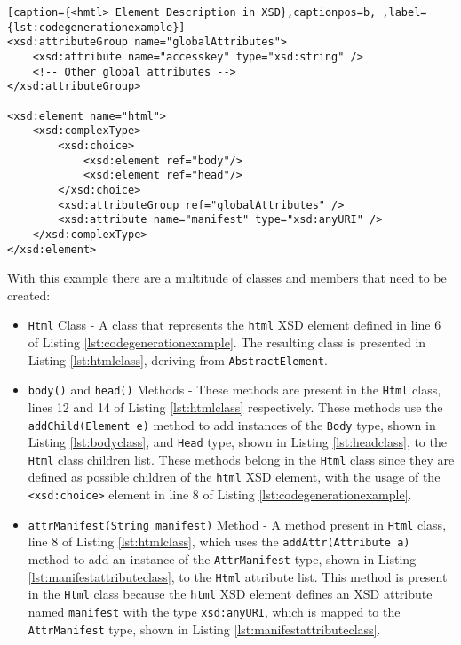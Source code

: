 \bigskip


\begin{minipage}{\linewidth}
\begin{lstlisting}[caption={<hmtl> Element Description in XSD},captionpos=b, ,label={lst:codegenerationexample}]
<xsd:attributeGroup name="globalAttributes">
    <xsd:attribute name="accesskey" type="xsd:string" />
    <!-- Other global attributes -->
</xsd:attributeGroup>

<xsd:element name="html">
    <xsd:complexType>
        <xsd:choice>
            <xsd:element ref="body"/>
            <xsd:element ref="head"/>
        </xsd:choice>
        <xsd:attributeGroup ref="globalAttributes" />
        <xsd:attribute name="manifest" type="xsd:anyURI" />
    </xsd:complexType>
</xsd:element>
\end{lstlisting}
\end{minipage}

\noindent
With this example there are a multitude of classes and members that need to be created:

\begin{itemize}
	\item \texttt{Html} Class - A class that represents the \texttt{html} \ac{XSD} element defined in line 6 of Listing \ref{lst:codegenerationexample}. The resulting class is presented in Listing \ref{lst:htmlclass}, deriving from \texttt{AbstractElement}.
	\item \texttt{body()} and \texttt{head()} Methods - These methods are present in the \texttt{Html} class, lines 12 and 14 of Listing \ref{lst:htmlclass} respectively. These methods use the \texttt{addChild(Element e)} method to add instances of the \texttt{Body} type, shown in Listing \ref{lst:bodyclass}, and \texttt{Head} type, shown in Listing \ref{lst:headclass}, to the \texttt{Html} class children list. These methods belong in the \texttt{Html} class since they are defined as possible children of the \texttt{html} \ac{XSD} element, with the usage of the \texttt{<xsd:choice>} element in line 8 of Listing \ref{lst:codegenerationexample}.
	\item \texttt{attrManifest(String manifest)} Method - A method present in \texttt{Html} class, line 8 of Listing \ref{lst:htmlclass}, which uses the \texttt{addAttr(Attribute a)} method to add an instance of the \texttt{AttrManifest} type, shown in Listing \ref{lst:manifestattributeclass}, to the \texttt{Html} attribute list. This method is present in the \texttt{Html} class because the \texttt{html} \ac{XSD} element defines an \ac{XSD} attribute named \texttt{manifest} with the type \texttt{xsd:anyURI}, which is mapped to the \texttt{AttrManifest} type, shown in Listing \ref{lst:manifestattributeclass}.
\end{itemize}

